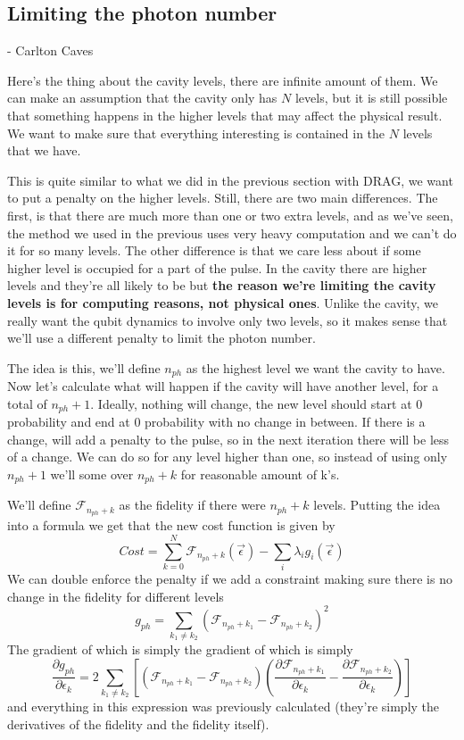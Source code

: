 \subsection{Limiting the photon number} 
\centerline{}
\centerline{- Carlton Caves}
Here's the thing about the cavity levels, there are infinite amount of them. We can make an assumption that the cavity only has $N$ levels, but it is still possible that something happens in the higher levels that may affect the physical result. We want to make sure that everything interesting is contained in the $N$ levels that we have.

This is quite similar to what we did in the previous section with DRAG, we want to put a penalty on the higher levels. Still, there are two main differences. The first, is that there are much more than one or two extra levels, and as we've seen, the method we used in the previous uses very heavy computation and we can't do it for so many levels. The other difference is that we care less about if some higher level is occupied for a part of the pulse. In the cavity there are higher levels and they're all likely to be but \textbf{the reason we're limiting the cavity levels is for computing reasons, not physical ones}. Unlike the cavity, we really want the qubit dynamics to involve only two levels, so it makes sense that we'll use a different penalty to limit the photon number.

The idea is this, we'll define $n_{ph}$ as the highest level we want the cavity to have. Now let's calculate what will happen if the cavity will have another level, for a total of $n_{ph} + 1$. Ideally, nothing will change, the new level should start at 0 probability and end at 0 probability with no change in between. If there is a change, will add a penalty to the pulse, so in the next iteration there will be less of a change. We can do so for any level higher than one, so instead of using only $n_{ph} + 1$ we'll some over $n_{ph} + k$ for reasonable amount of k's.

We'll define $\mathcal{F}_{n_{ph} + k}$ as the fidelity if there were $n_{ph} + k$ levels. Putting the idea into a formula we get that the new cost function is given by
\[
    Cost = \sum_{k=0}^{N} \mathcal{F}_{n_{ph} + k} (\vec{\epsilon}) - \sum_i \lambda_i g_i (\vec{\epsilon})
\]
We can double enforce the penalty if we add a constraint making sure there is no change in the fidelity for different levels
\[
    g_{ph} = \sum_{k_1 \ne k_2} (\mathcal{F}_{n_{ph} + k_1} - \mathcal{F}_{n_{ph} + k_2})^2
\]
The gradient of which is simply the gradient of which is simply
\[
    \frac{\partial g_{ph}}{\partial \epsilon_k} = 2 \sum_{k_1 \ne k_2} [ (\mathcal{F}_{n_{ph} + k_1} - \mathcal{F}_{n_{ph} + k_2}) (\frac{\partial \mathcal{F}_{n_{ph} + k_1}}{\partial \epsilon_k} - \frac{\partial \mathcal{F}_{n_{ph} + k_2}}{\partial \epsilon_k})]
\]
and everything in this expression was previously calculated (they're simply the derivatives of the fidelity and the fidelity itself).

